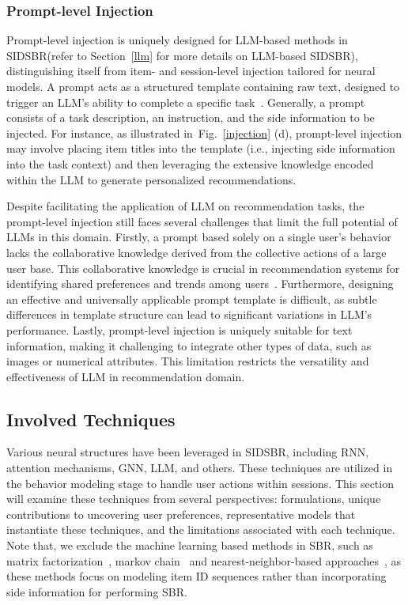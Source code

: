\documentclass[lettersize,journal]{IEEEtran}
\newcommand{\fig}{Fig.\xspace}
\newcommand{\baby}{{SIDSBR}\xspace}
\begin{document}
\subsubsection{Prompt-level Injection}\label{prompt_injection}
Prompt-level injection is uniquely designed for LLM-based methods in \baby (refer to Section~\ref{llm} for more details on LLM-based \baby), distinguishing itself from item- and session-level injection tailored  for neural models. A prompt acts as a structured template containing raw text, designed to trigger an LLM's ability to complete a specific task~\cite{liu@CS2023,Lin@SIGIR2024,Zhao@SIGIR2024}. Generally, a prompt consists of a task description, an instruction, and the side information to be injected. For instance, as illustrated in~\fig~\ref{injection} (d), prompt-level injection may involve placing item titles into the template (i.e., injecting side information into the task context) and then leveraging the extensive knowledge encoded within the LLM to generate personalized recommendations.

Despite facilitating the application of LLM on recommendation tasks, the prompt-level injection still faces several challenges that limit the full potential of LLMs in this domain. Firstly, a prompt based solely on a single user’s behavior lacks the collaborative knowledge derived from the collective actions of a large user base. This collaborative knowledge is crucial in recommendation systems for identifying shared preferences and trends among users~\cite{DIMO,Yuan@SIGIR2023}. Furthermore, designing an effective and universally applicable prompt template is difficult, as subtle differences in template structure can lead to significant variations in LLM's performance. Lastly, prompt-level injection is uniquely suitable for text information, making it challenging to integrate other types of data, such as images or numerical attributes. This limitation restricts the versatility and effectiveness of LLM in recommendation domain.


\subsection{Involved Techniques}
Various neural structures have been leveraged in \baby, including RNN, attention mechanisms, GNN, LLM, and others. These techniques are utilized in the behavior modeling stage to handle user actions within sessions. This section will examine these techniques from several perspectives: formulations, unique contributions to uncovering user preferences, representative models that instantiate these techniques, and the limitations associated with each technique. 
Note that, we exclude the machine learning based methods in SBR, such as matrix factorization~\cite{BPR-MF}, markov chain~\cite{MDP} and nearest-neighbor-based approaches~\cite{IKNN}, as these methods focus on modeling item ID sequences rather than incorporating side information for performing SBR.
\end{document}
